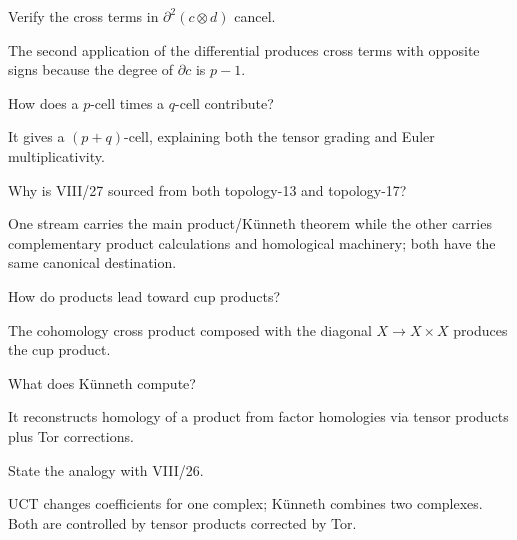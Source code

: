 \begin{problem}\label{prob:viii27-19}
Verify the cross terms in \(\partial^2(c\otimes d)\) cancel.
\end{problem}
\begin{solution}
The second application of the differential produces cross terms with opposite signs because the degree of \(\partial c\) is \(p-1\).
\end{solution}

\begin{problem}\label{prob:viii27-20}
How does a \(p\)-cell times a \(q\)-cell contribute?
\end{problem}
\begin{solution}
It gives a \((p+q)\)-cell, explaining both the tensor grading and Euler multiplicativity.
\end{solution}

\begin{problem}\label{prob:viii27-21}
Why is VIII/27 sourced from both topology-13 and topology-17?
\end{problem}
\begin{solution}
One stream carries the main product/Künneth theorem while the other carries complementary product calculations and homological machinery; both have the same canonical destination.
\end{solution}

\begin{problem}[Bridge]\label{prob:viii27-22}
How do products lead toward cup products?
\end{problem}
\begin{solution}
The cohomology cross product composed with the diagonal \(X\to X\times X\) produces the cup product.
\end{solution}

\begin{problem}\label{prob:viii27-23}
What does Künneth compute?
\end{problem}
\begin{solution}
It reconstructs homology of a product from factor homologies via tensor products plus Tor corrections.
\end{solution}

\begin{problem}\label{prob:viii27-24}
State the analogy with VIII/26.
\end{problem}
\begin{solution}
UCT changes coefficients for one complex; Künneth combines two complexes. Both are controlled by tensor products corrected by Tor.
\end{solution}
